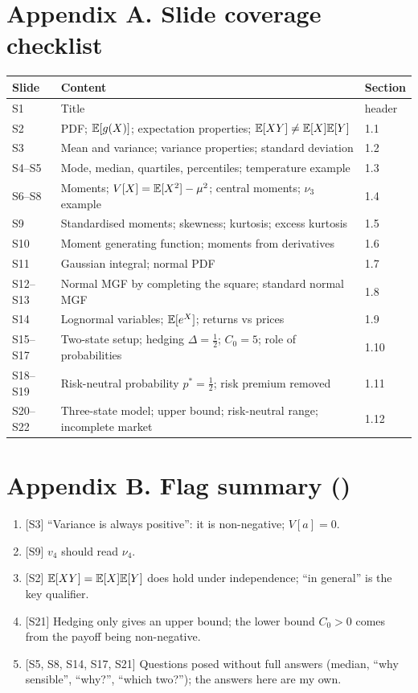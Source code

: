 \documentclass[10pt]{article}
\begin{document}
\section*{Appendix A. Slide coverage checklist}
{\small\begin{tabularx}{\linewidth}{@{}l X l@{}}\toprule
Slide & Content & Section\\\midrule
S1 & Title & header\\
S2 & PDF; $\mathbb{E}[g(X)]$; expectation properties; $\mathbb{E}[XY]\ne\mathbb{E}[X]\mathbb{E}[Y]$ & 1.1\\
S3 & Mean and variance; variance properties; standard deviation & 1.2\\
S4--S5 & Mode, median, quartiles, percentiles; temperature example & 1.3\\
S6--S8 & Moments; $V[X]=\mathbb{E}[X^2]-\mu^2$; central moments; $\nu_3$ example & 1.4\\
S9 & Standardised moments; skewness; kurtosis; excess kurtosis & 1.5\\
S10 & Moment generating function; moments from derivatives & 1.6\\
S11 & Gaussian integral; normal PDF & 1.7\\
S12--S13 & Normal MGF by completing the square; standard normal MGF & 1.8\\
S14 & Lognormal variables; $\mathbb{E}[e^X]$; returns vs prices & 1.9\\
S15--S17 & Two-state setup; hedging $\Delta=\frac12$; $C_0=5$; role of probabilities & 1.10\\
S18--S19 & Risk-neutral probability $p^*=\frac12$; risk premium removed & 1.11\\
S20--S22 & Three-state model; upper bound; risk-neutral range; incomplete market & 1.12\\\bottomrule
\end{tabularx}}

\section*{Appendix B. Flag summary (\flag)}
\begin{enumerate}
\item {}[S3] ``Variance is always positive'': it is non-negative; $V[a]=0$.
\item {}[S9] $v_4$ should read $\nu_4$.
\item {}[S2] $\mathbb{E}[XY]=\mathbb{E}[X]\mathbb{E}[Y]$ does hold under independence; ``in general'' is the key qualifier.
\item {}[S21] Hedging only gives an upper bound; the lower bound $C_0>0$ comes from the payoff being non-negative.
\item {}[S5, S8, S14, S17, S21] Questions posed without full answers (median, ``why sensible'', ``why?'', ``which two?''); the answers here are my own.
\end{enumerate}
\end{document}
